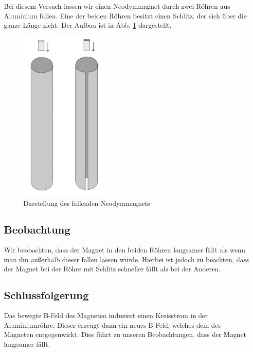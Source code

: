 \documentclass[11pt,a4paper,titlepage, ngerman]{article}
\begin{document}
		Bei diesem Versuch lassen wir einen Neodymmagnet durch zwei Röhren aus Aluminium fallen. Eine der beiden Röhren besitzt einen Schlitz, der sich über die ganze Länge zieht. Der Aufbau ist in Abb. \ref{fig:Neodymmagnet} dargestellt.
		
		\begin{figure}
			\centering
			\includegraphics[width=0.4\textwidth]{Neodymmagnet.png}
			\caption{Darstellung des fallenden Neodymmagnets} 
			\label{fig:Neodymmagnet}
		\end{figure}
		
		\subsection*{Beobachtung}
			
			Wir beobachten, dass der Magnet in den beiden Röhren langsamer fällt als wenn man ihn außerhalb dieser fallen lassen würde.
			Hierbei ist jedoch zu beachten, dass der Magnet bei der Röhre mit Schlitz schneller fällt als bei der Anderen.
			
		\subsection*{Schlussfolgerung}	
		
			Das bewegte B-Feld des Magneten induziert einen Kreisstrom in der Aluminiumröhre. Dieser erzeugt dann ein neues B-Feld, welches dem des Magneten entgegenwirkt. Dies führt zu unseren Beobachtungen, dass der Magnet langsamer fällt. %
			
\end{document}
